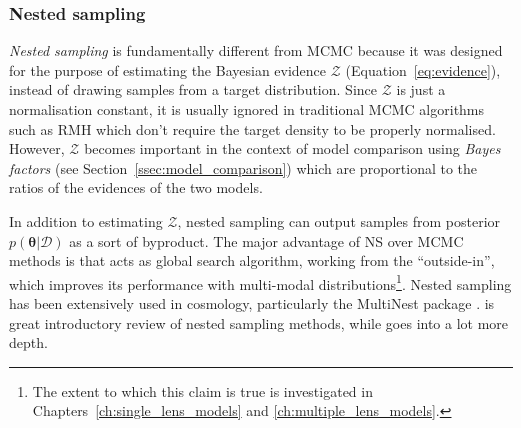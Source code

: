 \documentclass[12pt,dvipsnames]{report}
\newcommand{\ssf}[1]{\textsf{#1}}
\renewcommand{\vec}[1]{\boldsymbol{\mathbf{#1}}}
\begin{document}
\subsubsection{Nested sampling}
\label{sssec:ns}
\emph{Nested sampling} \citep{2004AIPC..735..395S}  is fundamentally different 
from MCMC because it was designed for the purpose  of estimating the
Bayesian evidence  $\mathcal{Z}$ (Equation~\ref{eq:evidence}), instead of drawing samples 
from  a target distribution.
Since $\mathcal{Z}$ is just a normalisation constant, it is usually ignored 
in traditional MCMC algorithms such as RMH which don't require the target 
density to be properly normalised.
However, $\mathcal{Z}$  becomes important in the context of model comparison 
using \emph{Bayes factors} (see Section~\ref{ssec:model_comparison}) which
are proportional to the ratios of the evidences of the two models. 

In addition to estimating $\mathcal{Z}$, nested sampling can output samples 
from posterior $p(\vec\theta\lvert \mathcal{D})$ as a sort of byproduct. 
The major advantage of NS over MCMC methods is that acts as 
global search algorithm, working from the ``outside-in'', which improves its 
performance with multi-modal distributions\footnote{
    The extent to which this claim is true is investigated in 
    Chapters~\ref{ch:single_lens_models} and \ref{ch:multiple_lens_models}.
}. Nested sampling has been extensively used in cosmology, 
particularly the \ssf{MultiNest} package \citep{arXiv:0809.3437}. 
\citet{arXiv:2205.15570} is great introductory review of nested sampling methods, while 
\citet{arXiv:2101.09675} goes into a lot more depth.
\end{document}
